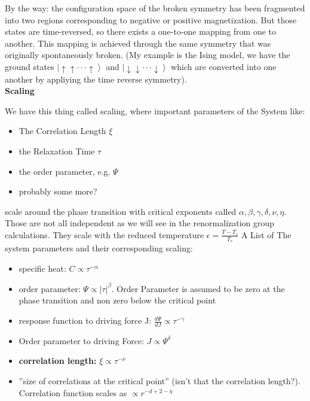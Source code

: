 		By the way: the configuration space of the broken symmetry has been fragmented into two regions corresponding to negative or positive magnetization. But those states are time-reversed, so there exists a one-to-one mapping from one to another. This mapping is achieved through the same symmetry that was originally spontaneously broken. (My example is the Ising model, we have the ground states $\left|\uparrow \uparrow \cdot \cdot \cdot \uparrow \right\rangle$ and $\left|\downarrow \downarrow \cdot \cdot \cdot \downarrow \right\rangle$ which are converted into one another by appliying the time reverse symmetry). \\
		
		\textbf{Scaling}
		
		We have this thing called scaling, where important parameters of the System like:					
		\begin{itemize}
			\item The Correlation Length $\xi$
			\item the Relaxation Time $\tau$
			\item the order parameter, e.g. $\Psi$
			\item probably some more?
		\end{itemize}
		scale around the phase transition with critical exponents called $\alpha, \beta, \gamma, \delta, \nu, \eta$. Those are not all independent as we will see in the renormalization group calculations. They scale with the reduced temperature $\epsilon = \frac{T - T_c}{T_c}$ A List of The system parameters and their corresponding scaling:
						
		\begin{itemize}
			\item specific heat: $C \propto \tau^{-\alpha}$
			\item order parameter: $\Psi \propto |\tau|^\beta$. Order Parameter is assumed to be zero at the phase transition and non zero below the critical point
			\item response function to driving force J: $\frac{d\Psi}{dJ} \propto	\tau^{-\gamma}$
			\item Order parameter to driving Force: $J\propto \Psi^\delta$
			\item \textbf{correlation length:} $\xi \propto \tau^{-\nu}$
			\item ''size of correlations at the critical point'' (isn't that the correlation length?). Correlation function scales as $ \propto r^{-d + 2 -\eta}$  
		\end{itemize}
		   
